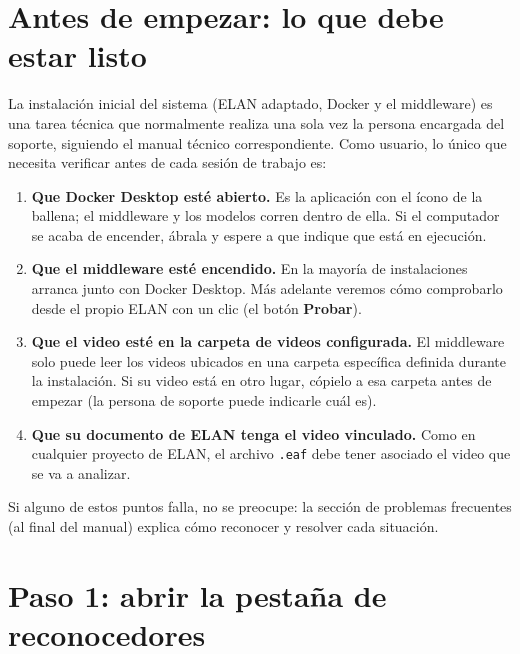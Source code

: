 \documentclass[12pt,a4paper]{article}
\begin{document}
\section{Antes de empezar: lo que debe estar listo}

La instalación inicial del sistema (ELAN adaptado, Docker y el middleware) es una tarea técnica que normalmente realiza una sola vez la persona encargada del soporte, siguiendo el manual técnico correspondiente. Como usuario, lo único que necesita verificar antes de cada sesión de trabajo es:

\begin{enumerate}[topsep=2pt]
    \item \textbf{Que Docker Desktop esté abierto.} Es la aplicación con el ícono de la ballena; el middleware y los modelos corren dentro de ella. Si el computador se acaba de encender, ábrala y espere a que indique que está en ejecución.
    \item \textbf{Que el middleware esté encendido.} En la mayoría de instalaciones arranca junto con Docker Desktop. Más adelante veremos cómo comprobarlo desde el propio ELAN con un clic (el botón \textbf{Probar}).
    \item \textbf{Que el video esté en la carpeta de videos configurada.} El middleware solo puede leer los videos ubicados en una carpeta específica definida durante la instalación. Si su video está en otro lugar, cópielo a esa carpeta antes de empezar (la persona de soporte puede indicarle cuál es).
    \item \textbf{Que su documento de ELAN tenga el video vinculado.} Como en cualquier proyecto de ELAN, el archivo \texttt{.eaf} debe tener asociado el video que se va a analizar.
\end{enumerate}

Si alguno de estos puntos falla, no se preocupe: la sección de problemas frecuentes (al final del manual) explica cómo reconocer y resolver cada situación.

\section{Paso 1: abrir la pestaña de reconocedores}
\end{document}
